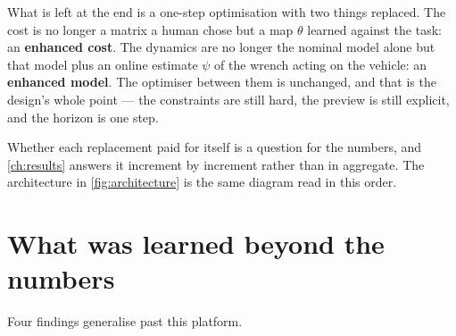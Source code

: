 \documentclass[11pt,a4paper,twoside,openright]{report}
\theoremstyle{plain}
\theoremstyle{definition}
\theoremstyle{remark}
\begin{document}
	What is left at the end is a one-step optimisation with two things replaced. The
	cost is no longer a matrix a human chose but a map $\theta$ learned against the
	task: an \textbf{enhanced cost}. The dynamics are no longer the nominal model
	alone but that model plus an online estimate $\psi$ of the wrench acting on the
	vehicle: an \textbf{enhanced model}. The optimiser between them is unchanged,
	and that is the design's whole point --- the constraints are still hard, the
	preview is still explicit, and the horizon is one step.

	Whether each replacement paid for itself is a question for the numbers, and
	\cref{ch:results} answers it increment by increment rather than in aggregate.
	The architecture in \cref{fig:architecture} is the same diagram read in this
	order.

	\section{What was learned beyond the numbers}

	Four findings generalise past this platform.
\end{document}
